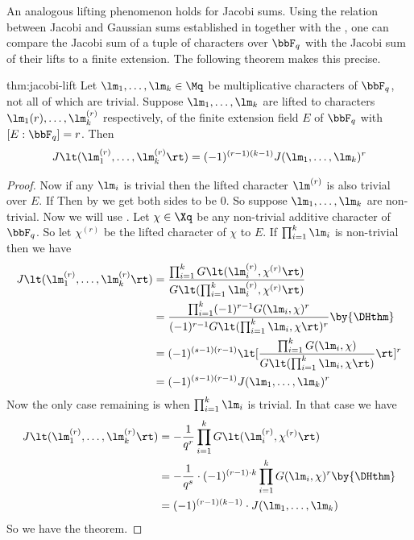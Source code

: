 An analogous lifting phenomenon holds for Jacobi sums. Using the relation between Jacobi and Gaussian sums established in  together with the \DHthm, one can compare the Jacobi sum of a tuple of characters over $\bbF_q$ with the Jacobi sum of their lifts to a finite extension. The following theorem makes this precise.
\begin{Theorem}{}{thm:jacobi-lift}
  Let $\lm_1,\dots,\lm_k\in\Mq$ be multiplicative characters of $\bbF_q$, not all of which are trivial. Suppose $\lm_1,\dots,\lm_k$ are lifted to characters $\lm_1{(r)},\dots, \lm_k^{(r)}$ respectively, of the finite extension field $E$ of $\bbF_q$ with $[E:\bbF_q]=r$. Then $$J\lt(\lm_1^{(r)},\dots, \lm_k^{(r)}\rt)=(-1)^{(r-1)(k-1)}J(\lm_1,\dots,\lm_k)^r$$
\end{Theorem}
\begin{proof}
  Now if any $\lm_i$ is trivial then the lifted character $\lm^{(r)}$ is also trivial over $E$. If Then by  we get both sides to be $0$. So suppose $\lm_1,\dots,\lm_k$ are non-trivial. Now we will use . Let $\chi\in\Xq$ be any non-trivial additive character of $\bbF_q$. So let $\chi^{(r)}$ be the lifted character of $\chi$ to $E$. If $\prod_{i=1}^k \lm_i$ is non-trivial then we have \begin{align*}
    J\lt(\lm_1^{(r)},\dots, \lm_k^{(r)}\rt) & = \frac{\prod_{i=1}^kG\lt(\lm_i^{(r)},\chi^{(r)}\rt)}{G\lt(\prod_{i=1}^k\lm_i^{(r)},\chi^{(r)}\rt)}\\
    & = \frac{\prod_{i=1}^k(-1)^{r-1}G(\lm_i,\chi)^r}{(-1)^{r-1}G\lt(\prod_{i=1}^k\lm_i,\chi\rt)^r}\by{\DHthm}\\
    & = (-1)^{(s-1)(r-1)}\lt[ \frac{\prod_{i=1}^kG(\lm_i,\chi)}{G\lt(\prod_{i=1}^k\lm_i,\chi\rt)} \rt]^r\\ 
    & = (-1)^{(s-1)(r-1)}J(\lm_1,\dots,\lm_k)^r
  \end{align*}
  Now the only case remaining is when $\prod_{i=1}^k \lm_i$ is trivial. In that case we have 
  \begin{align*}
    J\lt(\lm_1^{(r)},\dots, \lm_k^{(r)}\rt) & = -\frac1{q^r}\prod_{i=1}^k G\lt(\lm_i^{(r)},\chi^{(r)}\rt)\\
    & = -\frac1{q^s}\cdot (-1)^{(r-1)\cdot k}\prod_{i=1}^k G(\lm_i,\chi)^r\by{\DHthm}\\
    & = (-1)^{(r-1)(k-1)}\cdot J(\lm_1,\dots, \lm_k)
  \end{align*}
  So we have the theorem. 
\end{proof}